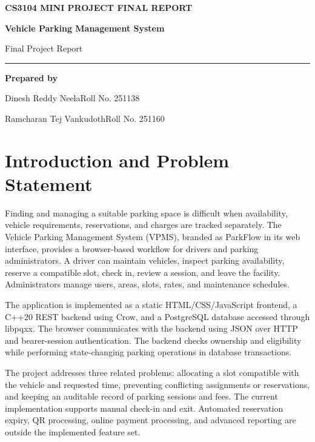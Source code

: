 \documentclass[12pt,a4paper]{article}
\begin{document}
\thispagestyle{empty}
\setlength{\parindent}{0pt}
\vspace*{1.8cm}
{\large\bfseries\color{green!35!black} CS3104 MINI PROJECT FINAL REPORT\par}
\vspace{1.1cm}
{\Huge\bfseries Vehicle Parking Management System\par}
\vspace{0.55cm}
{\large\color{black!65} Final Project Report\par}
\vspace{0.7cm}
{\color{green!35!black}\rule{0.9\textwidth}{1.2pt}\par}
\vspace{1.4cm}
{\Large\bfseries Prepared by\par}
\vspace{0.45cm}
{\large Dinesh Reddy Neela\hfill Roll No. 251138\par}
\vspace{0.3cm}
{\large Ramcharan Tej Vankudoth\hfill Roll No. 251160\par}
\vfill
\newpage
{}
\renewcommand{\contentsname}{Contents}
\begingroup\small\tableofcontents\endgroup
\clearpage

\section{Introduction and Problem Statement}
Finding and managing a suitable parking space is difficult when availability,
vehicle requirements, reservations, and charges are tracked separately. The
Vehicle Parking Management System (VPMS), branded as ParkFlow in its web
interface, provides a browser-based workflow for drivers and parking
administrators. A driver can maintain vehicles, inspect parking availability,
reserve a compatible slot, check in, review a session, and leave the facility.
Administrators manage users, areas, slots, rates, and maintenance schedules.

The application is implemented as a static HTML/CSS/JavaScript frontend, a
C++20 REST backend using Crow, and a PostgreSQL
database accessed through libpqxx. The browser communicates with the backend using JSON over HTTP and
bearer-session authentication. The backend checks ownership and eligibility
while performing state-changing parking operations in database transactions.

The project addresses three related problems: allocating a slot compatible
with the vehicle and requested time, preventing conflicting assignments or
reservations, and keeping an auditable record of parking sessions and fees.
The current implementation supports manual check-in and exit. Automated
reservation expiry, QR processing, online payment processing, and advanced
reporting are outside the implemented feature set.
\end{document}
